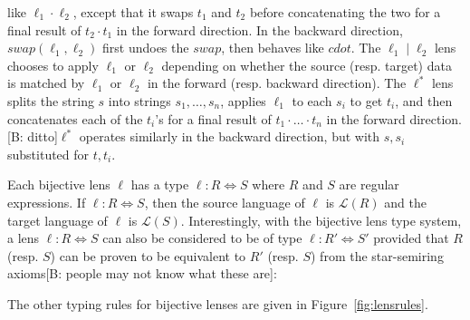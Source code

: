 \documentclass[acmsmall,review,anonymous]{acmart}
\newcommand{\FINISH}[3]{\ifdraft\textcolor{#1}{[#2: #3]}\fi}
\newcommand{\bcp}[1]{\FINISH{dkred}{B}{#1}}
\newcommand{\kw}[1]{\ensuremath{\mathit{#1}}}
\newcommand{\swap}{\ensuremath{\kw{swap}}}
\begin{document}
like $\ell_1 \cdot \ell_2$, except that it swaps $t_1$ and $t_2$ before
concatenating the two for a final result of $t_2 \cdot t_1$ in the forward
direction. In the backward direction, $\mathit{\swap}(\ell_1, \ell_2)$ first undoes
the \swap, then behaves like $cdot$. The $\ell_1 \; | \; \ell_2$ lens
chooses to apply $\ell_1$ or $\ell_2$ depending on whether the source
(resp. target) data is matched by $\ell_1$ or $\ell_2$ in the forward (resp.
backward direction). The $\ell^*$ lens splits the string $s$ into strings $s_1,
\ldots, s_n$, applies $\ell_1$ to each $s_i$ to get $t_i$, and then concatenates
each of the $t_i$'s for a final result of $t_1 \cdot \ldots \cdot t_n$ in the
forward direction. \bcp{ditto}$\ell^*$ operates similarly in the backward direction, but
with $s, s_i$ substituted for $t, t_i$.

Each bijective lens $\ell$ has a type $\ell : R \Leftrightarrow S$ where $R$ and
$S$ are regular expressions. If $\ell : R \Leftrightarrow S$, then the source
language of $\ell$ is $\mathcal{L}(R)$ and the target language of $\ell$ is
$\mathcal{L}(S)$. Interestingly, with the bijective lens type system, a lens
$\ell : R \Leftrightarrow S$ can also be considered to be of type $\ell : R'
\Leftrightarrow S'$ provided that $R$ (resp. $S$) can be proven to be
equivalent to $R'$ (resp. $S$) from the star-semiring axioms\bcp{people may
  not know what these are}:

\begin{prooftree}
\end{prooftree}

The other typing rules for bijective lenses are given in
Figure~\ref{fig:lensrules}.
\end{document}
